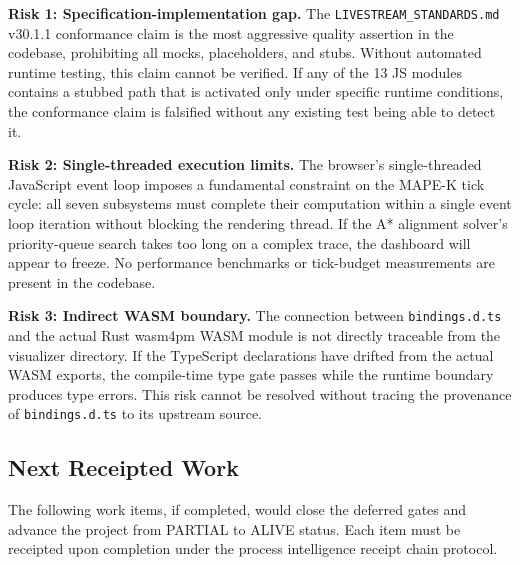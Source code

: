 \textbf{Risk 1: Specification-implementation gap.}
The \texttt{LIVESTREAM\_STANDARDS.md} v30.1.1 conformance claim is the most aggressive quality
assertion in the codebase, prohibiting all mocks, placeholders, and stubs. Without automated
runtime testing, this claim cannot be verified. If any of the 13 JS modules contains a
stubbed path that is activated only under specific runtime conditions, the conformance claim
is falsified without any existing test being able to detect it.

\textbf{Risk 2: Single-threaded execution limits.}
The browser's single-threaded JavaScript event loop imposes a fundamental constraint on the
MAPE-K tick cycle: all seven subsystems must complete their computation within a single event
loop iteration without blocking the rendering thread. If the A* alignment solver's
priority-queue search takes too long on a complex trace, the dashboard will appear to freeze.
No performance benchmarks or tick-budget measurements are present in the codebase.

\textbf{Risk 3: Indirect WASM boundary.}
The connection between \texttt{bindings.d.ts} and the actual Rust wasm4pm WASM module is not
directly traceable from the visualizer directory. If the TypeScript declarations have drifted
from the actual WASM exports, the compile-time type gate passes while the runtime boundary
produces type errors. This risk cannot be resolved without tracing the provenance of
\texttt{bindings.d.ts} to its upstream source.

\subsection{Next Receipted Work}
\label{sec:experiments-visualizer-openq-next}

The following work items, if completed, would close the deferred gates and advance the project
from PARTIAL to ALIVE status. Each item must be receipted upon completion under the process
intelligence receipt chain protocol.

